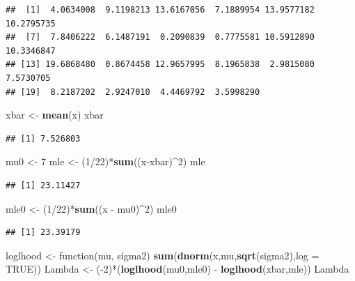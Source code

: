 \documentclass[]{book}
\newenvironment{Shaded}{\begin{snugshade}}{\end{snugshade}}
\newcommand{\KeywordTok}[1]{\textcolor[rgb]{0.13,0.29,0.53}{\textbf{{#1}}}}
\newcommand{\DataTypeTok}[1]{\textcolor[rgb]{0.13,0.29,0.53}{{#1}}}
\newcommand{\DecValTok}[1]{\textcolor[rgb]{0.00,0.00,0.81}{{#1}}}
\newcommand{\StringTok}[1]{\textcolor[rgb]{0.31,0.60,0.02}{{#1}}}
\newcommand{\OtherTok}[1]{\textcolor[rgb]{0.56,0.35,0.01}{{#1}}}
\newcommand{\NormalTok}[1]{{#1}}
\begin{document}
\begin{verbatim}
##  [1]  4.0634008  9.1198213 13.6167056  7.1889954 13.9577182 10.2795735
##  [7]  7.8406222  6.1487191  0.2090839  0.7775581 10.5912890 10.3346847
## [13] 19.6868480  0.8674458 12.9657995  8.1965838  2.9815080  7.5730705
## [19]  8.2187202  2.9247010  4.4469792  3.5998290
\end{verbatim}

\begin{Shaded}
\begin{Highlighting}[]
\NormalTok{xbar <-}\StringTok{ }\KeywordTok{mean}\NormalTok{(x)}
\NormalTok{xbar}
\end{Highlighting}
\end{Shaded}

\begin{verbatim}
## [1] 7.526803
\end{verbatim}

\begin{Shaded}
\begin{Highlighting}[]
\NormalTok{mu0 <-}\StringTok{ }\DecValTok{7}
\NormalTok{mle <-}\StringTok{ }\NormalTok{(}\DecValTok{1}\NormalTok{/}\DecValTok{22}\NormalTok{)*}\KeywordTok{sum}\NormalTok{((x-xbar)^}\DecValTok{2}\NormalTok{)}
\NormalTok{mle}
\end{Highlighting}
\end{Shaded}

\begin{verbatim}
## [1] 23.11427
\end{verbatim}

\begin{Shaded}
\begin{Highlighting}[]
\NormalTok{mle0 <-}\StringTok{ }\NormalTok{(}\DecValTok{1}\NormalTok{/}\DecValTok{22}\NormalTok{)*}\KeywordTok{sum}\NormalTok{((x -}\StringTok{ }\NormalTok{mu0)^}\DecValTok{2}\NormalTok{)}
\NormalTok{mle0}
\end{Highlighting}
\end{Shaded}

\begin{verbatim}
## [1] 23.39179
\end{verbatim}

\begin{Shaded}
\begin{Highlighting}[]
\NormalTok{loglhood <-}\StringTok{ }\NormalTok{function(mu, sigma2)  }\KeywordTok{sum}\NormalTok{(}\KeywordTok{dnorm}\NormalTok{(x,mu,}\KeywordTok{sqrt}\NormalTok{(sigma2),}\DataTypeTok{log =} \OtherTok{TRUE}\NormalTok{))}
\NormalTok{Lambda <-}\StringTok{ }\NormalTok{(-}\DecValTok{2}\NormalTok{)*(}\KeywordTok{loglhood}\NormalTok{(mu0,mle0) -}\StringTok{ }\KeywordTok{loglhood}\NormalTok{(xbar,mle)) }
\NormalTok{Lambda}
\end{Highlighting}
\end{Shaded}
\end{document}
